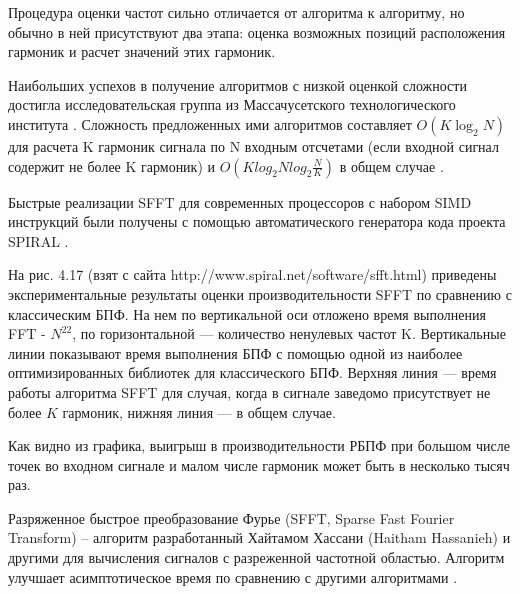 Процедура оценки частот сильно отличается от алгоритма к алгоритму, но обычно в ней присутствуют два этапа: оценка возможных позиций расположения гармоник и расчет значений этих гармоник.

Наибольших успехов в получение алгоритмов с низкой оценкой сложности достигла исследовательская группа из Массачусетского технологического института \cite{bottazzi2018new}. 
Сложность предложенных ими алгоритмов составляет $O(K \log_{2} N)$ для расчета K гармоник сигнала по N входным отсчетами (если входной сигнал содержит не более K гармоник) и $O(K log_{2} N log_{2} \frac{N}{K})$ в общем случае \cite{indyk2014sparse, indyk2014nearly}.

Быстрые реализации SFFT для современных процессоров с набором SIMD инструкций были получены с помощью автоматического генератора кода проекта SPIRAL \cite{schumacher2014high, spiral}.


На рис. 4.17 (взят с сайта http://www.spiral.net/software/sfft.html) приведены
экспериментальные результаты оценки производительности SFFT по сравнению с классическим БПФ.
На нем по вертикальной оси отложено время выполнения FFT - $N^{22}$,
по горизонтальной — количество ненулевых частот K. Вертикальные линии
показывают время выполнения БПФ с помощью одной из наиболее оптимизированных
библиотек для классического БПФ. Верхняя линия — время работы алгоритма SFFT для случая, когда в сигнале заведомо присутствует не более $K$ гармоник, нижняя линия — в общем случае.


Как видно из графика, выигрыш в производительности РБПФ при большом числе точек во входном сигнале и
малом числе гармоник может быть в несколько тысяч раз.
 
Разряженное быстрое преобразование Фурье (SFFT, Sparse Fast Fourier Transform) -- алгоритм разработанный Хайтамом Хассани (Haitham Hassanieh) и другими \cite{hassanieh2012simple} для вычисления сигналов с разреженной частотной областью. Алгоритм улучшает асимптотическое время по сравнению с другими алгоритмами \cite{hassanieh2012nearly}.

